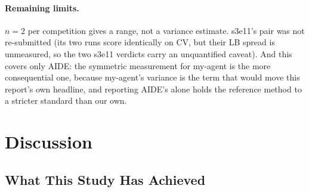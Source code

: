 \documentclass[11pt,a4paper]{article}
\begin{document}
\paragraph{Remaining limits.} $n=2$ per competition gives a range, not a variance estimate. s3e11's pair was not re-submitted (its two runs score identically on CV, but their LB spread is unmeasured, so the two s3e11 verdicts carry an unquantified caveat). And this covers only AIDE: the symmetric measurement for my-agent is the more consequential one, because my-agent's variance is the term that would move this report's own headline, and reporting AIDE's alone holds the reference method to a stricter standard than our own.

\section{Discussion}

\subsection{What This Study Has Achieved}
\end{document}
